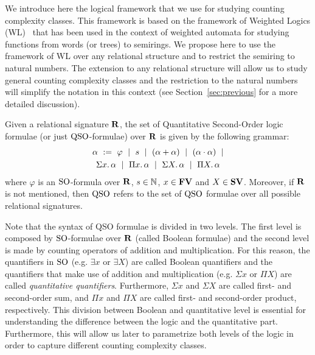 
We introduce here the logical framework that we use for studying counting complexity classes. 
This framework is based on the framework of Weighted Logics (WL)~\cite{DrosteG07}  that has been used in the context of weighted automata for studying functions from words (or trees) to semirings. 
We propose here to use the framework of WL over any relational structure and to restrict the semiring to natural numbers. 
The extension to any relational structure will allow us to study general counting complexity classes and the restriction to the natural numbers will simplify the notation in this context (see Section~\ref{sec:previous} for a more detailed discussion).

Given a relational signature $\mathbf{R}$, the set of Quantitative Second-Order logic formulae (or just ${\rm QSO}$-formulae) over $\mathbf{R}$ is given by the following grammar:
\begin{multline}
\alpha \ := \ \varphi \ \mid \ s \ \mid \ (\alpha \add \alpha) \ \mid\ (\alpha \mult \alpha) \ \mid \\ \sa{x} \alpha \ \mid \ \pa{x} \alpha \ \mid \ \sa{X} \alpha \ \mid \ \pa{X} \alpha \label{syntax} 
\end{multline}
where $\varphi$ is an ${\rm SO}$-formula over $\mathbf{R}$, $s \in \mathbb{N}$, $x \in \mathbf{FV}$ and $X \in \mathbf{SV}$. Moreover, if $\mathbf{R}$ is not mentioned, then ${\rm QSO}$ refers to the set of ${\rm QSO}$ formulae over all possible relational signatures.
 
Note that the syntax of QSO formulae is divided in two levels. 
The first level is composed by ${\rm SO}$-formulae over $\mathbf{R}$ (called Boolean formulae) and the second level is made by counting operators of addition and multiplication. 
For this reason, the quantifiers in ${\rm SO}$ (e.g. $\exists x$ or $\exists X$) are called Boolean quantifiers and the quantifiers that make use of addition and multiplication (e.g. $\Sigma x$ or $\Pi X$) are called {\em quantitative quantifiers}.
Furthermore, $\Sigma x$ and $\Sigma X$ are called first- and second-order sum, and $\Pi x$ and $\Pi X$ are called first- and second-order product, respectively.
This division between Boolean and quantitative level is essential for understanding the difference between the logic and the quantitative part. 
Furthermore, this will allow us later to parametrize both levels of the logic in order to capture different counting complexity classes.

